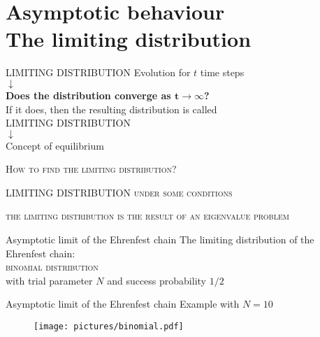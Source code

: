 \section{Asymptotic behaviour\\\small{The limiting distribution}}
  \begin{frame}{LIMITING DISTRIBUTION}
    \centering
    Evolution for $t$ time steps\\\medskip
    $\downarrow$\\\medskip
    \large \textbf{Does the distribution converge as $\mathbf{t \rightarrow \infty}$?}\\\medskip \small If it does, then the resulting distribution is called \medskip
    \\\medskip
    \Large
    \MakeUppercase{\alert{Limiting distribution}}\\\medskip
    $\downarrow$\\\medskip
    \normalsize
    Concept of \alert{equilibrium}
  \end{frame}

  \begin{frame}
    \centering\Large
    \textsc{How to find the limiting distribution?}\\
    \vspace{30pt}
  \end{frame}

  \begin{frame}{LIMITING DISTRIBUTION}
    \centering
      \vspace{30pt}
      \textsc{under some conditions}

      \vspace{10pt}
      \Large
      \textsc{\alert{the limiting distribution is the result of an eigenvalue problem}}
  \end{frame}
\begin{frame}{Asymptotic limit of the Ehrenfest chain}
    \Large 
    \centering
    \vspace{20pt}
    The limiting distribution of the Ehrenfest chain:\\
    \vspace{30pt}
    \textsc{\alert{binomial distribution}}\\
    \vspace{30pt}
    \normalsize
    with trial parameter \alert{$N$} and success probability \alert{$1/2$}
  \end{frame}
  
  \begin{frame}{Asymptotic limit of the Ehrenfest chain}
    \vspace{30pt}
    Example with $N = 10$
    \begin{figure}
      \texttt{[image: pictures/binomial.pdf]}
    \end{figure}
  \end{frame}

